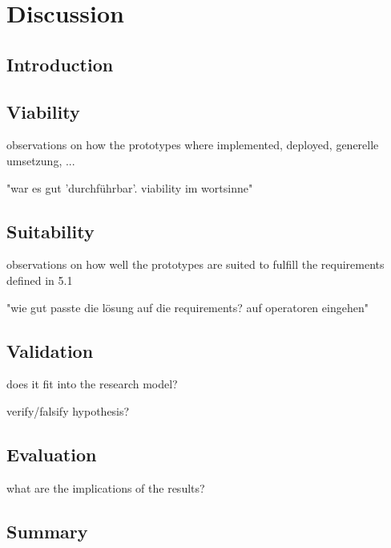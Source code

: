 \chapter{Discussion}


\section{Introduction}


\section{Viability}

observations on how the prototypes where implemented, deployed, generelle umsetzung, ...

"war es gut 'durchführbar'. viability im wortsinne"


\section{Suitability}

observations on how well the prototypes are suited to fulfill the requirements defined in 5.1

"wie gut passte die lösung auf die requirements? auf operatoren eingehen"


\section{Validation}

does it fit into the research model?

verify/falsify hypothesis?


\section{Evaluation}

what are the implications of the results?


\section{Summary}
